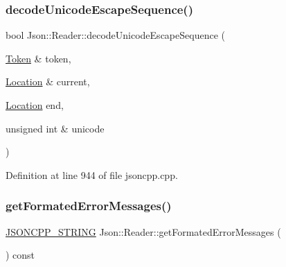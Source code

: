 \hypertarget{class_json_1_1_reader_a469cb6f55971d7c41fca2752a3aa5bf7}{}\label{class_json_1_1_reader_a469cb6f55971d7c41fca2752a3aa5bf7} 
\subsubsection{\texorpdfstring{decode\+Unicode\+Escape\+Sequence()}{decodeUnicodeEscapeSequence()}\hspace{0.1cm}{\footnotesize\ttfamily [2/2]}}
{\footnotesize\ttfamily bool Json\+::\+Reader\+::decode\+Unicode\+Escape\+Sequence (\begin{DoxyParamCaption}\item[{\hyperlink{class_json_1_1_reader_1_1_token}{Token} \&}]{token,  }\item[{\hyperlink{class_json_1_1_reader_a46795b5b272bf79a7730e406cb96375a}{Location} \&}]{current,  }\item[{\hyperlink{class_json_1_1_reader_a46795b5b272bf79a7730e406cb96375a}{Location}}]{end,  }\item[{unsigned int \&}]{unicode }\end{DoxyParamCaption})\hspace{0.3cm}{\ttfamily [private]}}



Definition at line 944 of file jsoncpp.\+cpp.

\hypertarget{class_json_1_1_reader_a791cbc5afd1bef1631e07239dc452c79}{}\label{class_json_1_1_reader_a791cbc5afd1bef1631e07239dc452c79} 
\subsubsection{\texorpdfstring{get\+Formated\+Error\+Messages()}{getFormatedErrorMessages()}\hspace{0.1cm}{\footnotesize\ttfamily [1/2]}}
{\footnotesize\ttfamily \hyperlink{config_8h_a1e723f95759de062585bc4a8fd3fa4be}{J\+S\+O\+N\+C\+P\+P\+\_\+\+S\+T\+R\+I\+NG} Json\+::\+Reader\+::get\+Formated\+Error\+Messages (\begin{DoxyParamCaption}{ }\end{DoxyParamCaption}) const}



